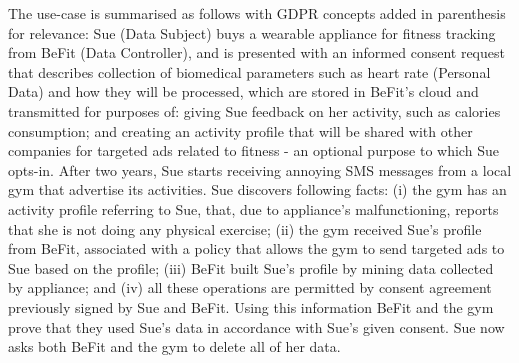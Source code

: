 The use-case is summarised as follows with GDPR concepts added in parenthesis for relevance: Sue (Data Subject) buys a wearable appliance for fitness tracking from BeFit (Data Controller), and is presented with an informed consent request that describes collection of biomedical parameters such as heart rate (Personal Data) and how they will be processed, which are stored in BeFit's cloud and transmitted for purposes of: giving Sue feedback on her activity, such as calories consumption; and creating an activity profile that will be shared with other companies for targeted ads related to fitness - an optional purpose to which Sue opts-in. After two years, Sue starts receiving annoying SMS messages from a local gym that advertise its activities. Sue discovers following facts: (i) the gym has an activity profile referring to Sue, that, due to appliance’s malfunctioning, reports that she is not doing any physical exercise; (ii) the gym received Sue's profile from BeFit, associated with a policy that allows the gym to send targeted ads to Sue based on the profile; (iii) BeFit built Sue's profile by mining data collected by appliance; and (iv) all these operations are permitted by consent agreement previously signed by Sue and BeFit. Using this information BeFit and the gym prove that they used Sue’s data in accordance with Sue's given consent. Sue now asks both BeFit and the gym to delete all of her data. 

